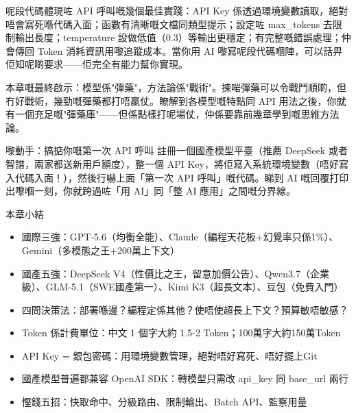 呢段代碼體現咗 API 呼叫嘅幾個最佳實踐：API Key 係透過環境變數讀取，絕對唔會寫死喺代碼入面；函數有清晰嘅文檔同類型提示；設定咗 max\_tokens 去限制輸出長度；temperature 設做低值（0.3）等輸出更穩定；有完整嘅錯誤處理；仲會傳回 Token 消耗資訊用嚟追蹤成本。當你用 AI 嚟寫呢段代碼嗰陣，可以話畀佢知呢啲要求——佢完全有能力幫你實現。

本章嘅最終啟示：模型係"彈藥"，方法論係"戰術"。揀啱彈藥可以令戰鬥順啲，但冇好戰術，幾勁嘅彈藥都打唔贏仗。瞭解到各模型嘅特點同 API 用法之後，你就有一個充足嘅"彈藥庫"——但係點樣打呢場仗，仲係要靠前幾章學到嘅思維方法論。

\begin{tcbpractice}{嚟動手：搞掂你嘅第一次 API 呼叫}
註冊一個國產模型平臺（推薦 DeepSeek 或者智譜，兩家都送新用戶額度），整一個 API Key，將佢寫入系統環境變數（唔好寫入代碼入面！），然後行嚇上面「第一次 API 呼叫」嘅代碼。睇到 AI 嘅回覆打印出嚟嗰一刻，你就跨過咗「用 AI」同「整 AI 應用」之間嘅分界線。

\end{tcbpractice}

\begin{tcbsummary}{本章小結}
\begin{itemize}
  \item 國際三強：GPT-5.6（均衡全能）、Claude（編程天花板+幻覺率只係1\%）、Gemini（多模態之王+200萬上下文）
  \item 國產五強：DeepSeek V4（性價比之王，留意加價公告）、Qwen3.7（企業級）、GLM-5.1（SWE國產第一）、Kimi K3（超長文本）、豆包（免費入門）
  \item 四問決策法：部署喺邊？編程定係其他？使唔使超長上下文？預算敏唔敏感？
  \item Token 係計費單位：中文 1 個字大約 1.5-2 Token；100萬字大約150萬Token
  \item API Key = 銀包密碼：用環境變數管理，絕對唔好寫死、唔好擺上Git
  \item 國產模型普遍都兼容 OpenAI SDK：轉模型只需改 api\_key 同 base\_url 兩行
  \item 慳錢五招：快取命中、分級路由、限制輸出、Batch API、監察用量
\end{itemize}

\end{tcbsummary}
